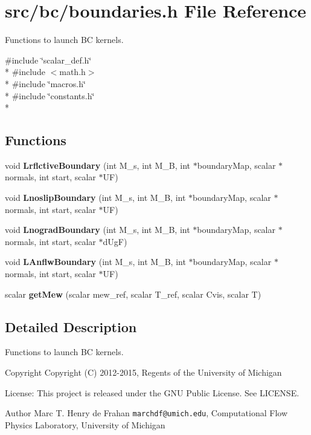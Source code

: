 \section{src/bc/boundaries.h File Reference}
\label{boundaries_8h}


Functions to launch B\-C kernels.  


{\ttfamily \#include \char`\"{}scalar\-\_\-def.\-h\char`\"{}}\\*
{\ttfamily \#include $<$math.\-h$>$}\\*
{\ttfamily \#include \char`\"{}macros.\-h\char`\"{}}\\*
{\ttfamily \#include \char`\"{}constants.\-h\char`\"{}}\\*
\subsection*{Functions}
\begin{DoxyCompactItemize}
\item 
void {\bf Lrflctive\-Boundary} (int M\-\_\-s, int M\-\_\-\-B, int $\ast$boundary\-Map, scalar $\ast$normals, int start, scalar $\ast$U\-F)
\item 
void {\bf Lnoslip\-Boundary} (int M\-\_\-s, int M\-\_\-\-B, int $\ast$boundary\-Map, scalar $\ast$normals, int start, scalar $\ast$U\-F)
\item 
void {\bf Lnograd\-Boundary} (int M\-\_\-s, int M\-\_\-\-B, int $\ast$boundary\-Map, scalar $\ast$normals, int start, scalar $\ast$d\-Ug\-F)
\item 
void {\bf L\-Anflw\-Boundary} (int M\-\_\-s, int M\-\_\-\-B, int $\ast$boundary\-Map, scalar $\ast$normals, int start, scalar $\ast$U\-F)
\item 
scalar {\bfseries get\-Mew} (scalar mew\-\_\-ref, scalar T\-\_\-ref, scalar Cvis, scalar T)\label{boundaries_8h_ac48429583cb7094b338db866283fa0a1}

\end{DoxyCompactItemize}


\subsection{Detailed Description}
Functions to launch B\-C kernels. \begin{DoxyCopyright}{Copyright}
Copyright (C) 2012-\/2015, Regents of the University of Michigan 
\end{DoxyCopyright}
\begin{DoxyParagraph}{License\-:}
This project is released under the G\-N\-U Public License. See L\-I\-C\-E\-N\-S\-E. 
\end{DoxyParagraph}
\begin{DoxyAuthor}{Author}
Marc T. Henry de Frahan {\tt marchdf@umich.\-edu}, Computational Flow Physics Laboratory, University of Michigan 
\end{DoxyAuthor}


